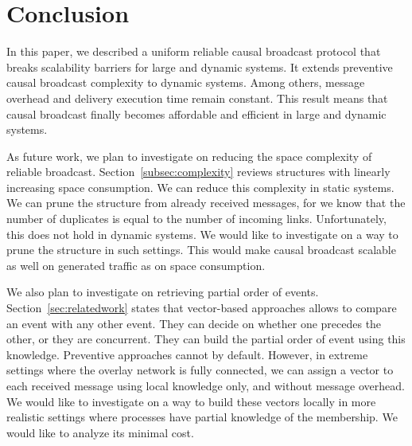 
\section{Conclusion}
\label{sec:conclusion}

In this paper, we described a uniform reliable causal broadcast protocol that
breaks scalability barriers for large and dynamic systems. It extends preventive
causal broadcast complexity to dynamic systems. Among others, message overhead
and delivery execution time remain constant.
This result means that causal broadcast finally becomes affordable and efficient
in large and dynamic systems.

As future work, we plan to investigate on reducing the space complexity of
reliable broadcast. Section~\ref{subsec:complexity} reviews structures with
linearly increasing space consumption. We can reduce this complexity in static
systems. We can prune the structure from already received messages, for we know
that the number of duplicates is equal to the number of incoming
links. Unfortunately, this does not hold in dynamic systems. We would like to
investigate on a way to prune the structure in such settings. This would make
causal broadcast scalable as well on generated traffic as on space consumption.

We also plan to investigate on retrieving partial order of
events. Section~\ref{sec:relatedwork} states that vector-based approaches allows
to compare an event with any other event. They can decide on whether one
precedes the other, or they are concurrent. They can build the partial order of
event using this knowledge. Preventive approaches cannot by default. However, in
extreme settings where the overlay network is fully connected, we can assign a
vector to each received message using local knowledge only, and without message
overhead. We would like to investigate on a way to build these vectors locally
in more realistic settings where processes have partial knowledge of the
membership. We would like to analyze its minimal cost.

